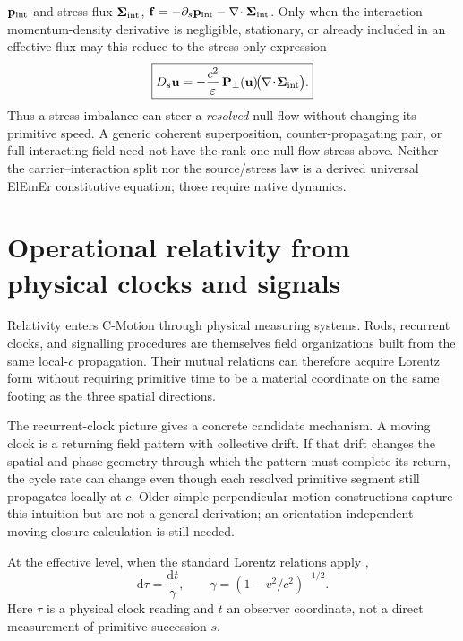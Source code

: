 \documentclass[11pt]{article}
\theoremstyle{definition}
\newcommand{\cmotion}{\mbox{C-Motion}}
\newcommand{\dd}{\mathrm{d}}
\begin{document}
$\mathbf p_{\rm int}$ and stress flux $\boldsymbol\Sigma_{\rm int}$,
$\mathbf f=-\partial_s\mathbf p_{\rm int}-\nabla\!\cdot\boldsymbol\Sigma_{\rm int}$.
Only when the interaction momentum-density derivative is negligible, stationary, or
already included in an effective flux may this reduce to the stress-only expression
\begin{equation}
\boxed{
 D_s\mathbf u=-\frac{c^2}{\varepsilon}\,
 \mathbf P_\perp(\mathbf u)\!\bigl(\nabla\!\cdot\!\boldsymbol\Sigma_{\rm int}\bigr).}
\label{eq:stress_divergence_steering}
\end{equation}
Thus a stress imbalance can steer a \emph{resolved} null flow without changing its
primitive speed.  A generic coherent superposition, counter-propagating pair, or full
interacting field need not have the rank-one null-flow stress above.  Neither the
carrier--interaction split nor the source/stress law is a derived universal ElEmEr
constitutive equation; those require native dynamics.

\section{Operational relativity from physical clocks and signals}
\label{sec:lorentz_effective}

Relativity enters \cmotion{} through physical measuring systems.  Rods, recurrent clocks,
and signalling procedures are themselves field organizations built from the same
local-$c$ propagation.  Their mutual relations can therefore acquire Lorentz form without
requiring primitive time to be a material coordinate on the same footing as the three
spatial directions.

The recurrent-clock picture gives a concrete candidate mechanism.  A moving clock is a
returning field pattern with collective drift.  If that drift changes the spatial and
phase geometry through which the pattern must complete its return, the cycle rate can
change even though each resolved primitive segment still propagates locally at $c$.
Older simple perpendicular-motion constructions capture this intuition but are not a
general derivation; an orientation-independent moving-closure calculation is still
needed.

At the effective level, when the standard Lorentz relations apply
\cite{Einstein1905Relativity},
\begin{equation}
\dd\tau=\frac{\dd t}{\gamma},\qquad
\gamma=(1-v^2/c^2)^{-1/2}.
\label{eq:effective_lorentz_clock}
\end{equation}
Here $\tau$ is a physical clock reading and $t$ an observer coordinate, not a direct
measurement of primitive succession $s$.
\end{document}
